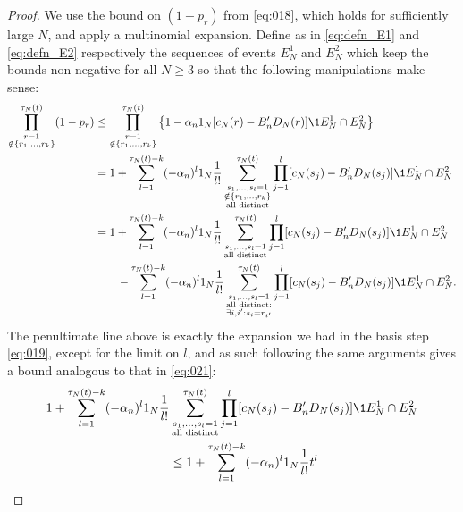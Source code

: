 \begin{proof}
We use the bound on $(1-p_r)$ from \eqref{eq:018}, which holds for sufficiently large $N$, and apply a multinomial expansion. Define as in \eqref{eq:defn_E1} and \eqref{eq:defn_E2} respectively the sequences of events $E_N^1$ and $E_N^2$ which keep the bounds non-negative for all $N\geq 3$ so that the following manipulations make sense:
\begin{align}
\prod_{\substack{r=1 \\ \notin \{r_1,\dots,r_k\} }}^{\tau_N(t)} (1-p_r)
&\leq \prod_{\substack{r=1 \\ \notin \{r_1,\dots,r_k\} }}^{\tau_N(t)} 
        \left\{ 1 - \alpha_n  \ON [ c_N(r) - B_n^\prime D_N(r) ] 
        \1{E_N^1 \cap E_N^2} \right\} \notag\\
&= 1 + \sum_{l=1}^{\tau_N(t) -k}
        (-\alpha_n)^l \ON \frac{1}{l!}
        \sum_{\substack{s_1, \dots, s_l =1 \\ \notin \{r_1,\dots,r_k\} 
        \\ \text{all distinct} }}^{\tau_N(t)}
        \prod_{j=1}^l [ c_N(s_j) - B_n^\prime D_N(s_j) ]
        \1{E_N^1 \cap E_N^2} \notag\\
&= 1 + \sum_{l=1}^{\tau_N(t) -k}
        (-\alpha_n)^l \ON \frac{1}{l!}
        \sum_{\substack{ s_1, \dots, s_l =1 \\ \text{all distinct} }}^{\tau_N(t)}
        \prod_{j=1}^l [ c_N(s_j) - B_n^\prime D_N(s_j) ] \1{E_N^1 \cap E_N^2} \notag\\
    &\qquad- \sum_{l=1}^{\tau_N(t) -k}
        (-\alpha_n)^l \ON \frac{1}{l!}
        \sum_{\substack{s_1, \dots, s_l =1 \\ \text{all distinct}: 
        \\ \exists i,i^\prime : s_i=r_{i^\prime} }}^{\tau_N(t)} 
        \prod_{j=1}^l [ c_N(s_j) - B_n^\prime D_N(s_j) ]
        \1{E_N^1 \cap E_N^2} . \label{eq:031}
\end{align}
The penultimate line above is exactly the expansion we had in the basis step \eqref{eq:019}, except for the limit on $l$, and as such following the same arguments gives a bound analogous to that in \eqref{eq:021}:
\begin{align*}
1 + \sum_{l=1}^{\tau_N(t) -k}
        (-\alpha_n)^l \ON \frac{1}{l!}
        &\sum_{\substack{ s_1, \dots, s_l =1 \\ \text{all distinct} }}^{\tau_N(t)}
        \prod_{j=1}^l [ c_N(s_j) - B_n^\prime D_N(s_j) ] \1{E_N^1 \cap E_N^2} \\
&\leq 1+ \sum_{l=1}^{\tau_N(t) -k} (-\alpha_n)^l \ON \frac{1}{l!} t^l

\end{align*}
\end{proof}
